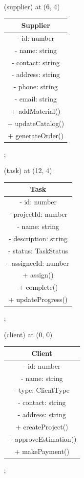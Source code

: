      (supplier) at (6, 4) {
        \begin{tabular}{c}
            \textbf{Supplier} \\
            \hline
            - id: number \\
            - name: string \\
            - contact: string \\
            - address: string \\
            - phone: string \\
            - email: string \\
            \hline
            + addMaterial() \\
            + updateCatalog() \\
            + generateOrder()
        \end{tabular}
    };
    
     (task) at (12, 4) {
        \begin{tabular}{c}
            \textbf{Task} \\
            \hline
            - id: number \\
            - projectId: number \\
            - name: string \\
            - description: string \\
            - status: TaskStatus \\
            - assigneeId: number \\
            \hline
            + assign() \\
            + complete() \\
            + updateProgress()
        \end{tabular}
    };
    
     (client) at (0, 0) {
        \begin{tabular}{c}
            \textbf{Client} \\
            \hline
            - id: number \\
            - name: string \\
            - type: ClientType \\
            - contact: string \\
            - address: string \\
            \hline
            + createProject() \\
            + approveEstimation() \\
            + makePayment()
        \end{tabular}
    };
    

